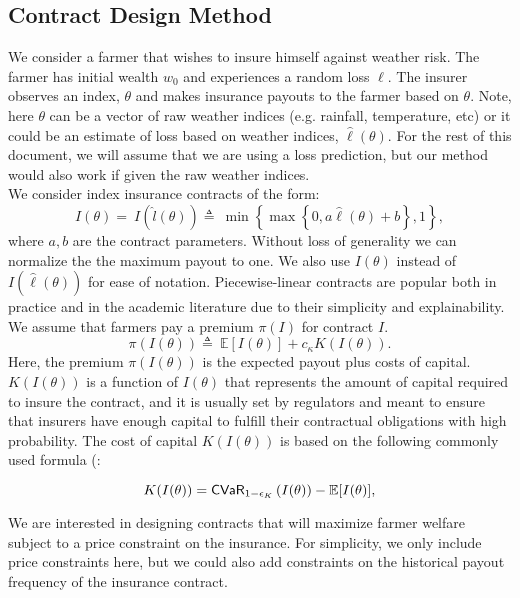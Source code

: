 \documentclass[12pt]{article}
\begin{document}
\subsection{Contract Design Method}
We consider a farmer that wishes to insure himself against weather risk. The farmer has initial wealth $w_0$ and experiences a random loss $\ell$. The insurer observes an index, $\theta$ and makes insurance payouts to the farmer based on $\theta$. Note, here $\theta$ can be a vector of raw weather indices (e.g. rainfall, temperature, etc) or it could be an estimate of loss based on weather indices, $\hat{\ell}(\theta)$. For the rest of this document, we will assume that we are using a loss prediction, but our method would also work if given the raw weather indices.\\
We consider index insurance contracts of the form: 
\begin{equation}\label{eq-01}
 I(\theta)=\ I(\hat{l}(\theta)) \triangleq\ \min \left \{\max \left \{0,a\hat{\ell}(\theta) + b \right \}, 1 \right \}, 
\end{equation}
where $a,b$ are the contract parameters. Without loss of generality we can normalize the the maximum payout to one. We also use $I(\theta)$ instead of $I(\hat{\ell}(\theta))$ for ease of notation. Piecewise-linear contracts are popular both in practice and in the academic literature due to their simplicity and explainability. \\
We assume that farmers pay a premium $\pi(I)$ for contract $I$. \begin{equation}\label{eq-02}
 \pi(I(\theta)) \triangleq\ \mathbb{E}[I(\theta)] + c_{\kappa} K(I(\theta)).
\end{equation}
Here, the premium $\pi(I(\theta))$ is the expected payout plus costs of capital. $K(I(\theta))$ is a function of $I(\theta)$ that represents the amount of capital required to insure the contract, and it is usually set by regulators and meant to ensure that insurers have enough capital to fulfill their contractual obligations with high probability. The cost of capital $K(I(\theta))$ is based on the following commonly used formula (\cite{mapfumo2017risk}:

\begin{equation}\label{cons-budget}
 K(I(\theta)) =  {\sf CVaR}_{1-\epsilon_K}\left ( I(\theta)\right )  - \mathbb{E}[I(\theta)],
\end{equation}

We are interested in designing contracts that will maximize farmer welfare subject to a price constraint on the insurance. For simplicity, we only include price constraints here, but we could also add constraints on the historical payout frequency of the insurance contract. 
\end{document}
